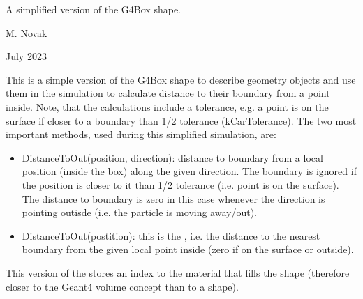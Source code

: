 \documentclass[letterpaper,10pt,english]{sphinxmanual}
\begin{document}
\begin{fulllineitems}
\label{\detokenize{Simulation/SimulationCodeDoc:_CPPv43Box}}
\pysigstartsignatures
\pysigstartmultiline
{}
\pysigstopmultiline
\pysigstopsignatures
\sphinxAtStartPar
A simplified version of the G4Box shape. 

\sphinxAtStartPar
\begin{description}
\sphinxAtStartPar
M. Novak 

\sphinxAtStartPar
July 2023

\end{description}


\sphinxAtStartPar
This is a simple version of the G4Box shape to describe geometry objects and use them in the simulation to calculate distance to their boundary from a point inside. Note, that the calculations include a tolerance, e.g. a point is on the surface if closer to a boundary than 1/2 tolerance (kCarTolerance). The two most important methods, used during this simplified simulation, are:

\sphinxAtStartPar
\begin{itemize}
\item {} 
\sphinxAtStartPar
DistanceToOut(position, direction): distance to boundary from a local position (inside the box) along the given direction. The boundary is ignored if the position is closer to it than 1/2 tolerance (i.e. point is on the surface). The distance to boundary is zero in this case whenever the direction is pointing outisde (i.e. the particle is moving away/out).

\item {} 
\sphinxAtStartPar
DistanceToOut(postition): this is the , i.e. the distance to the nearest boundary from the given local point inside (zero if on the surface or outside).

\end{itemize}


\sphinxAtStartPar
This version of the {\hyperref[\detokenize{Simulation/SimulationCodeDoc:class_box}]{}} stores an index to the material that fills the shape (therefore closer to the Geant4  volume concept than to a shape).


\end{fulllineitems}
\end{document}
